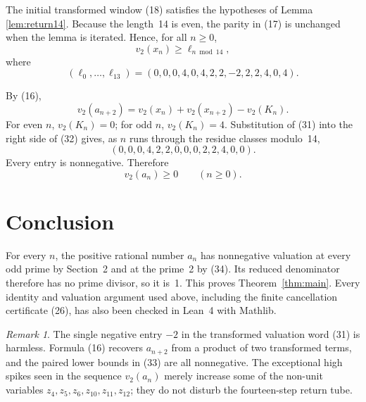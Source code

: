 \documentclass[11pt]{article}
\theoremstyle{remark}
\newtheorem{remark}[theorem]{Remark}
\newcommand{\vt}{v_2}
\begin{document}
The initial transformed window (18) satisfies the hypotheses of Lemma
\ref{lem:return14}.  Because the length~14 is even, the parity in (17) is
unchanged when the lemma is iterated.  Hence, for all $n\geq0$,
\[
 \vt(x_n)\geq \ell_{n\bmod14},                                  \tag{30}
\]
where
\[
 (\ell_0,\ldots,\ell_{13})
 =(0,0,0,4,0,4,2,2,-2,2,2,4,0,4).                              \tag{31}
\]

By (16),
\[
 \vt(a_{n+2})
 =\vt(x_n)+\vt(x_{n+2})-\vt(K_n).                              \tag{32}
\]
For even $n$, $\vt(K_n)=0$; for odd $n$, $\vt(K_n)=4$.  Substitution of
(31) into the right side of (32) gives, as $n$ runs through the residue
classes modulo~14,
\[
 (0,0,0,4,2,2,0,0,0,2,2,4,0,0).                              \tag{33}
\]
Every entry is nonnegative.  Therefore
\[
 \vt(a_n)\geq0
 \qquad(n\geq0).                                                \tag{34}
\]

\section{Conclusion}

For every $n$, the positive rational number $a_n$ has nonnegative valuation
at every odd prime by Section~2 and at the prime~2 by (34).  Its reduced
denominator therefore has no prime divisor, so it is~1.  This proves
Theorem~\ref{thm:main}.  Every identity and valuation argument used above,
including the finite cancellation certificate (26), has also been checked
in Lean~4 with Mathlib.

\begin{remark}
The single negative entry $-2$ in the transformed valuation word (31) is
harmless.  Formula (16) recovers $a_{n+2}$ from a product of two transformed
terms, and the paired lower bounds in (33) are all nonnegative.  The
exceptional high spikes seen in the sequence $\vt(a_n)$ merely increase some
of the non-unit variables $z_4,z_5,z_6,z_{10},z_{11},z_{12}$; they do not
disturb the fourteen-step return tube.
\end{remark}
\end{document}
